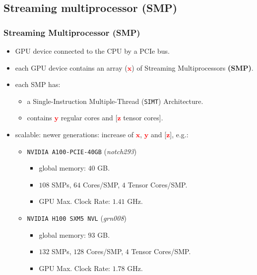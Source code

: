 \subsection{Streaming multiprocessor (SMP)}
\begin{frame}
\frametitle{Streaming Multiprocessor (SMP)}
\begin{itemize}
\item GPU device connected to the CPU by a PCIe bus. 
\item each GPU device contains an array (\textcolor{red}{$\mathbf{x}$}) of Streaming Multiprocessors \textbf{(SMP)}.
\item each SMP has:
\begin{itemize}
   \item a Single-Instruction Multiple-Thread (\texttt{SIMT}) Architecture.
   \item contains \textcolor{red}{$\mathbf{y}$} regular cores and [\textcolor{red}{$\mathbf{z}$} tensor cores].
\end{itemize} 
\item scalable: newer generations: increase of \textcolor{red}{$\mathbf{x}$}, \textcolor{red}{$\mathbf{y}$} 
	and [\textcolor{red}{$\mathbf{z}$}], e.g.:
   \begin{itemize}
	   \item \texttt{NVIDIA A100-PCIE-40GB} (\textit{notch293})
         \begin{itemize}
            \item global memory: $40$ GB.			 
            \item $108$ SMPs, $64$ Cores/SMP, $4$ Tensor Cores/SMP.
            \item GPU Max. Clock Rate: $1.41$ GHz.
         \end{itemize}		   
 \item \texttt{NVIDIA H100 SXM5 NVL} (\textit{grn008})	
         \begin{itemize}
            \item global memory: $93$ GB.			 
            \item $132$ SMPs, $128$ Cores/SMP, $4$ Tensor Cores/SMP.
	    \item GPU Max. Clock Rate: $1.78$ GHz. 
         \end{itemize}
   \end{itemize}		   
\end{itemize}
\end{frame} 

